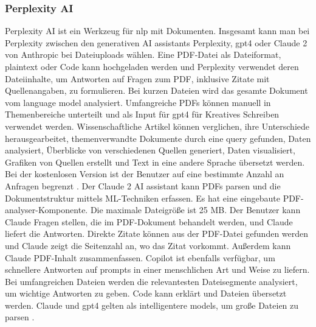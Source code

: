 \subsubsection{Perplexity AI}
Perplexity AI ist ein Werkzeug für \gls{nlp} mit Dokumenten. Insgesamt kann man bei Perplexity zwischen den generativen AI assistants Perplexity, \gls{gpt4} oder Claude 2 von Anthropic bei Dateiuploads wählen. Eine PDF-Datei als Dateiformat, plaintext oder Code kann hochgeladen werden und Perplexity verwendet deren Dateiinhalte, um Antworten auf Fragen zum PDF, inklusive Zitate mit Quellenangaben, zu formulieren. Bei kurzen Dateien wird das gesamte Dokument vom language model analysiert. Umfangreiche PDFs können manuell in Themenbereiche unterteilt und als Input für \gls{gpt4} für Kreatives Schreiben verwendet werden. Wissenschaftliche Artikel können verglichen, ihre Unterschiede herausgearbeitet, themenverwandte Dokumente durch eine query gefunden, Daten analysiert, Überblicke von verschiedenen Quellen generiert, Daten visualisiert, Grafiken von Quellen erstellt und Text in eine andere Sprache übersetzt werden. Bei der kostenlosen Version ist der Benutzer auf eine bestimmte Anzahl an Anfragen begrenzt \cite{hackernoon-claude}. Der Claude 2 AI assistant kann PDFs parsen und die Dokumentstruktur mittels ML-Techniken erfassen. Es hat eine eingebaute PDF-analyser-Komponente. Die maximale Dateigröße ist 25 MB. Der Benutzer kann Claude Fragen stellen, die im PDF-Dokument behandelt werden, und Claude liefert die Antworten. Direkte Zitate können aus der PDF-Datei gefunden werden und Claude zeigt die Seitenzahl an, wo das Zitat vorkommt. Außerdem kann Claude PDF-Inhalt zusammenfassen. Copilot ist ebenfalls verfügbar, um schnellere Antworten auf prompts in einer menschlichen Art und Weise zu liefern. Bei umfangreichen Dateien werden die relevantesten Dateisegmente analysiert, um wichtige Antworten zu geben. Code kann erklärt und Dateien übersetzt werden. Claude und \gls{gpt4} gelten als intelligentere models, um große Dateien zu parsen \cite{perplexity}.

